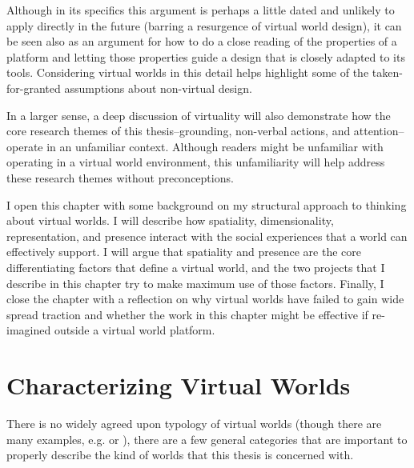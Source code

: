 Although in its specifics this argument is perhaps a little dated and unlikely to apply directly in the future (barring a resurgence of virtual world design), it can be seen also as an argument for how to do a close reading of the properties of a platform and letting those properties guide a design that is closely adapted to its tools. Considering virtual worlds in this detail helps highlight some of the taken-for-granted assumptions about non-virtual design.

In a larger sense, a deep discussion of virtuality will also demonstrate how the core research themes of this thesis--grounding, non-verbal actions, and attention--operate in an unfamiliar context. Although readers might be unfamiliar with operating in a virtual world environment, this unfamiliarity will help address these research themes without preconceptions.

I open this chapter with some background on my structural approach to thinking about virtual worlds. I will describe how spatiality, dimensionality, representation, and presence interact with the social experiences that a world can effectively support. I will argue that spatiality and presence are the core differentiating factors that define a virtual world, and the two projects that I describe in this chapter try to make maximum use of those factors. Finally, I close the chapter with a reflection on why virtual worlds have failed to gain wide spread traction and whether the work in this chapter might be effective if re-imagined outside a virtual world platform. 

% 
% 
% 
% 
% 
% 
% 
% 
% 
% 
% 


\section{Characterizing Virtual Worlds}

There is no widely agreed upon typology of virtual worlds (though there are many examples, e.g. \citep{Koster:2007wg} or \citep{Bartle:2003up}), there are a few general categories that are important to properly describe the kind of worlds that this thesis is concerned with.

